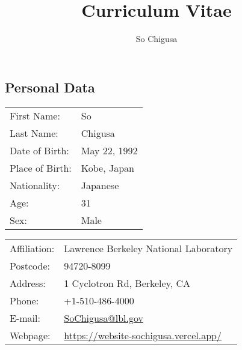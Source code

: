 \documentclass[12pt]{article}
\title{\vspace{-2cm}\textbf{Curriculum Vitae}}
\author{So Chigusa}
\begin{document}
\large
\maketitle

\newcommand{\lsim}{\stackrel{<}{_\sim}}
\newcommand{\gsim}{\stackrel{>}{_\sim}}

\newcommand{\rem}[1]{{$\spadesuit$\bf #1$\spadesuit$}}


\renewcommand{\thefootnote}{\arabic{footnote})}
\setcounter{footnote}{0}

\vspace{-5mm}
\subsection*{Personal Data}

\vspace{-3mm}

\begin{table}[h]
 \begin{tabular}{ll}
  First Name: & So %
      \\
  Last Name: & Chigusa %
      \\
  Date of Birth: & May 22, 1992 \\
  Place of Birth: & Kobe, Japan \\
  Nationality: & Japanese \\
  Age: & 31 \\
  Sex: & Male \\
 \end{tabular}
\end{table}

\vspace{-5mm}
\begin{table}[h]
 \begin{tabular}{ll}
  Affiliation: & Lawrence Berkeley National Laboratory \\
  Postcode: & 94720-8099 \\
  Address: & 1 Cyclotron Rd, Berkeley, CA \\
  Phone: & +1-510-486-4000 \\
  E-mail: &
      \href{mailto:SoChigusa@lbl.gov}{SoChigusa@lbl.gov}
      \\
  Webpage: & \url{https://website-sochigusa.vercel.app/} \\
 \end{tabular}
\end{table}
\vspace{-5mm}
\end{document}

